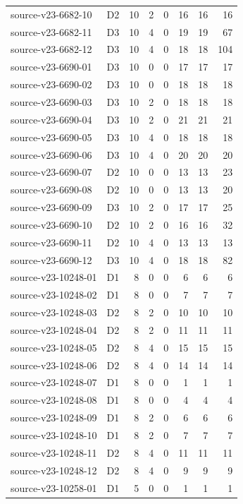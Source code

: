 \begin{longtable}{p{}lrrrrrr}
source-v23-6682-10 & D2 & 10 & 2 & 0 & 16 & 16 & 16\\
source-v23-6682-11 & D3 & 10 & 4 & 0 & 19 & 19 & 67\\
source-v23-6682-12 & D3 & 10 & 4 & 0 & 18 & 18 & 104\\
source-v23-6690-01 & D3 & 10 & 0 & 0 & 17 & 17 & 17\\
source-v23-6690-02 & D3 & 10 & 0 & 0 & 18 & 18 & 18\\
source-v23-6690-03 & D3 & 10 & 2 & 0 & 18 & 18 & 18\\
source-v23-6690-04 & D3 & 10 & 2 & 0 & 21 & 21 & 21\\
source-v23-6690-05 & D3 & 10 & 4 & 0 & 18 & 18 & 18\\
source-v23-6690-06 & D3 & 10 & 4 & 0 & 20 & 20 & 20\\
source-v23-6690-07 & D2 & 10 & 0 & 0 & 13 & 13 & 23\\
source-v23-6690-08 & D2 & 10 & 0 & 0 & 13 & 13 & 20\\
source-v23-6690-09 & D3 & 10 & 2 & 0 & 17 & 17 & 25\\
source-v23-6690-10 & D2 & 10 & 2 & 0 & 16 & 16 & 32\\
source-v23-6690-11 & D2 & 10 & 4 & 0 & 13 & 13 & 13\\
source-v23-6690-12 & D3 & 10 & 4 & 0 & 18 & 18 & 82\\
source-v23-10248-01 & D1 & 8 & 0 & 0 & 6 & 6 & 6\\
source-v23-10248-02 & D1 & 8 & 0 & 0 & 7 & 7 & 7\\
source-v23-10248-03 & D2 & 8 & 2 & 0 & 10 & 10 & 10\\
source-v23-10248-04 & D2 & 8 & 2 & 0 & 11 & 11 & 11\\
source-v23-10248-05 & D2 & 8 & 4 & 0 & 15 & 15 & 15\\
source-v23-10248-06 & D2 & 8 & 4 & 0 & 14 & 14 & 14\\
source-v23-10248-07 & D1 & 8 & 0 & 0 & 1 & 1 & 1\\
source-v23-10248-08 & D1 & 8 & 0 & 0 & 4 & 4 & 4\\
source-v23-10248-09 & D1 & 8 & 2 & 0 & 6 & 6 & 6\\
source-v23-10248-10 & D1 & 8 & 2 & 0 & 7 & 7 & 7\\
source-v23-10248-11 & D2 & 8 & 4 & 0 & 11 & 11 & 11\\
source-v23-10248-12 & D2 & 8 & 4 & 0 & 9 & 9 & 9\\
source-v23-10258-01 & D1 & 5 & 0 & 0 & 1 & 1 & 1\\

\end{longtable}
